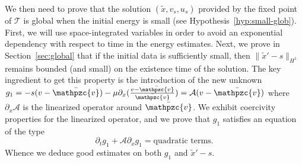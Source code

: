 \documentclass[AHL,Unicode,longabstracts,published]{cedram}
\newcommand{\p}{\partial}
\newcommand{\bv}{\bar{\mathpzc{v}}}
\newcommand{\cA}{\mathcal A}
\newcommand{\cT}{\mathcal T}
\newcommand{\tx}{\widetilde{x}}
\newcommand{\tx}{\widetilde{x}}
\begin{document}
We then need to prove that the solution $(\tx, v_s, u_s)$ provided by the fixed point of $\cT$ is global when the initial energy is small (see Hypothesis~\eqref{hyp:small-glob}). First, we will use space-integrated variables in order to avoid an exponential dependency with respect to time in the energy estimates. Next, we prove in Section~\ref{sec:global} that if the initial data is sufficiently small, then $\|\tx'-s\|_{H^1}$ remains bounded (and small) on the existence time of the solution. The key ingredient to get this property is the introduction of the new unknown $g_1 = -s (v-\bv) - \mu \partial_x (\frac{v-\bv}{\bv}) = \cA(v-\bv)$ where $\partial_x \cA$ is the linearized operator around $\bv$. We exhibit coercivity properties for the linearized operator, and we prove that $g_1$ satisfies an equation of the type
\[
\p_t g_1 + \cA\p_x g_1=\text{quadratic terms}.
\]
Whence we deduce good estimates on both $g_1$ and $\tx'-s$.
\end{document}
